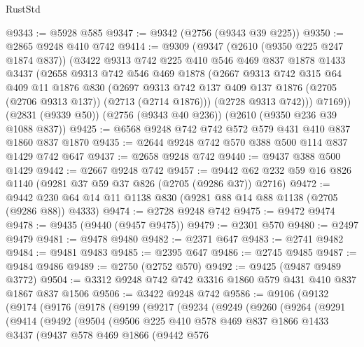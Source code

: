 \begin{lexlean}{RustStd}
\begin{coremodule}
@9343 := @5928 @585
@9347 := @9342 (@2756 (@9343 @39 @225))
@9350 := @2865 @9248 @410 @742
@9414 := @9309
    (@9347
      (@2610 (@9350 @225 @247 @1874 @837))
      (@3422
        @9313
        @742
        @225
        @410
        @546
        @469
        @837
        @1878
        @1433
        @3437
        (@2658
          @9313
          @742
          @546
          @469
          @1878
          (@2667
            @9313
            @742
            @315
            @64
            @409
            @11
            @1876
            @830
            (@2697 @9313 @742 @137 @409 @137 @1876 (@2705 (@2706 @9313 @137)) (@2713 (@2714 @1876)))
            (@2728 @9313 @742)))
        @7169))
    (@2831 (@9339 @50))
    (@2756 (@9343 @40 @236))
    (@2610 (@9350 @236 @39 @1088 @837))
@9425 := @6568 @9248 @742 @742 @572 @579 @431 @410 @837 @1860 @837 @1870
@9435 := @2644 @9248 @742 @570 @388 @500 @114 @837 @1429 @742 @647
@9437 := @2658 @9248 @742
@9440 := @9437 @388 @500 @1429
@9442 := @2667 @9248 @742
@9457 := @9442 @62 @232 @59 @16 @826 @1140 (@9281 @37 @59 @37 @826 (@2705 (@9286 @37)) @2716)
@9472 := @9442 @230 @64 @14 @11 @1138 @830 (@9281 @88 @14 @88 @1138 (@2705 (@9286 @88)) @4333)
@9474 := @2728 @9248 @742
@9475 := @9472 @9474
@9478 := @9435 (@9440 (@9457 @9475))
@9479 := @2301 @570
@9480 := @2497 @9479
@9481 := @9478 @9480
@9482 := @2371 @647
@9483 := @2741 @9482
@9484 := @9481 @9483
@9485 := @2395 @647
@9486 := @2745 @9485
@9487 := @9484 @9486
@9489 := @2750 (@2752 @570)
@9492 := @9425 (@9487 @9489 @3772)
@9504 := @3312 @9248 @742 @742 @3316 @1860 @579 @431 @410 @837 @1867 @837 @1506
@9506 := @3422 @9248 @742
@9586 := @9106
    (@9132
      (@9174
        (@9176
          (@9178
            (@9199
              (@9217
                (@9234
                  (@9249
                    (@9260
                      (@9264
                        (@9291
                          (@9414
                            (@9492
                              (@9504
                                (@9506
                                  @225
                                  @410
                                  @578
                                  @469
                                  @837
                                  @1866
                                  @1433
                                  @3437
                                  (@9437
                                    @578
                                    @469
                                    @1866
                                    (@9442
                                      @576

\end{coremodule}
\end{lexlean}
